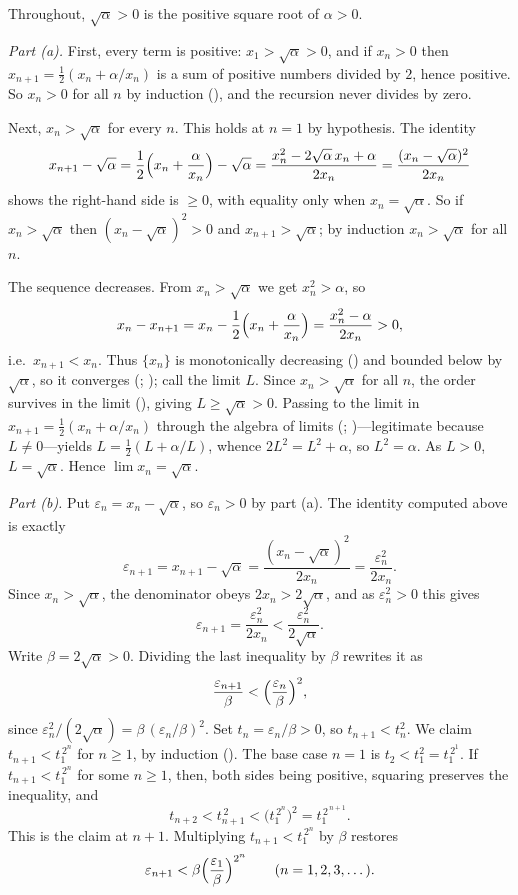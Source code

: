 \documentclass[main.tex]{subfiles}
\begin{document}
\begin{SolutionBlue}
Throughout, $\sqrt{\alpha}>0$ is the positive square root of $\alpha>0$.

\emph{Part (a).} First, every term is positive: $x_1>\sqrt\alpha>0$, and if $x_n>0$ then
$x_{n+1}=\tfrac12(x_n+\alpha/x_n)$ is a sum of positive numbers divided by $2$, hence positive. So
$x_n>0$ for all $n$ by induction (), and the recursion never divides by zero.

Next, $x_n>\sqrt\alpha$ for every $n$. This holds at $n=1$ by hypothesis. The identity
\[
x_{n+1}-\sqrt\alpha
=\frac12\Bigl(x_n+\frac{\alpha}{x_n}\Bigr)-\sqrt\alpha
=\frac{x_n^2-2\sqrt\alpha\,x_n+\alpha}{2x_n}
=\frac{(x_n-\sqrt\alpha)^2}{2x_n}
\]
shows the right-hand side is $\ge 0$, with equality only when $x_n=\sqrt\alpha$. So if $x_n>\sqrt\alpha$
then $(x_n-\sqrt\alpha)^2>0$ and $x_{n+1}>\sqrt\alpha$; by induction $x_n>\sqrt\alpha$ for all $n$.

The sequence decreases. From $x_n>\sqrt\alpha$ we get $x_n^2>\alpha$, so
\[
x_n-x_{n+1}=x_n-\frac12\Bigl(x_n+\frac{\alpha}{x_n}\Bigr)=\frac{x_n^2-\alpha}{2x_n}>0,
\]
i.e.\ $x_{n+1}<x_n$. Thus $\{x_n\}$ is monotonically decreasing () and bounded below by
$\sqrt\alpha$, so it converges (;
); call the limit $L$. Since $x_n>\sqrt\alpha$ for all $n$, the order survives in the
limit (), giving $L\ge\sqrt\alpha>0$. Passing to the limit in
$x_{n+1}=\tfrac12(x_n+\alpha/x_n)$ through the algebra of limits (; )---legitimate because $L\neq 0$---yields
$L=\tfrac12(L+\alpha/L)$, whence $2L^2=L^2+\alpha$, so $L^2=\alpha$. As $L>0$, $L=\sqrt\alpha$. Hence
$\lim x_n=\sqrt\alpha$.

\emph{Part (b).} Put $\varepsilon_n=x_n-\sqrt\alpha$, so $\varepsilon_n>0$ by part (a). The identity
computed above is exactly
\[
\varepsilon_{n+1}=x_{n+1}-\sqrt\alpha=\frac{(x_n-\sqrt\alpha)^2}{2x_n}=\frac{\varepsilon_n^2}{2x_n}.
\]
Since $x_n>\sqrt\alpha$, the denominator obeys $2x_n>2\sqrt\alpha$, and as $\varepsilon_n^2>0$ this
gives
\[
\varepsilon_{n+1}=\frac{\varepsilon_n^2}{2x_n}<\frac{\varepsilon_n^2}{2\sqrt\alpha}.
\]
Write $\beta=2\sqrt\alpha>0$. Dividing the last inequality by $\beta$ rewrites it as
\[
\frac{\varepsilon_{n+1}}{\beta}<\Bigl(\frac{\varepsilon_n}{\beta}\Bigr)^{2},
\]
since $\varepsilon_n^2/(2\sqrt\alpha)=\beta\,(\varepsilon_n/\beta)^2$. Set $t_n=\varepsilon_n/\beta>0$,
so $t_{n+1}<t_n^2$. We claim $t_{n+1}<t_1^{\,2^{n}}$ for $n\ge 1$, by induction (). The
base case $n=1$ is $t_2<t_1^2=t_1^{\,2^{1}}$. If $t_{n+1}<t_1^{\,2^{n}}$ for some $n\ge 1$, then, both
sides being positive, squaring preserves the inequality, and
\[
t_{n+2}<t_{n+1}^{\,2}<\bigl(t_1^{\,2^{n}}\bigr)^{2}=t_1^{\,2^{\,n+1}}.
\]
This is the claim at $n+1$. Multiplying $t_{n+1}<t_1^{\,2^{n}}$ by $\beta$ restores
\[
\varepsilon_{n+1}<\beta\Bigl(\frac{\varepsilon_1}{\beta}\Bigr)^{2^{n}}\qquad(n=1,2,3,\dots).
\]


\end{SolutionBlue}
\end{document}
